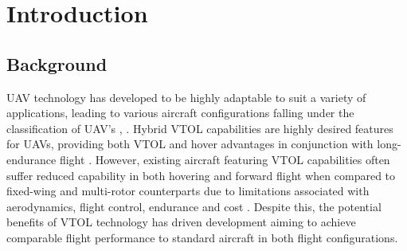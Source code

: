 \newpage
%

\justifying

\newpage




\newpage


\tableofcontents
\listoffigures
\listoftables
\lstlistoflistings



\clearpage



\setcounter{page}{1}
\pagestyle{fancy}
\fancyhf{}
\fancyfoot[C]{\thepage}

\justifying

\section{Introduction} %

\subsection{Background}
UAV technology has developed to be highly adaptable to suit a variety of applications, leading to various aircraft configurations falling under the classification of UAV's \citep{thamm2015songbird}, \citep{RN8}. Hybrid VTOL capabilities are highly desired features for UAVs, providing both VTOL and hover advantages in conjunction with long-endurance flight \citep{RN15}. However, existing aircraft featuring VTOL capabilities often suffer reduced capability in both hovering and forward flight when compared to fixed-wing and multi-rotor counterparts due to limitations associated with aerodynamics, flight control, endurance and cost \citep{RN15}. Despite this, the potential benefits of VTOL technology has driven development aiming to achieve comparable flight performance to standard aircraft in both flight configurations.

